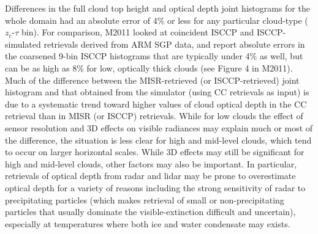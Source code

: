 Differences in the full cloud top height and optical depth joint
histograms for the whole domain had an absolute error of 4\% or less for
any particular cloud-type (\(z_c\)-\(\tau\) bin). For comparison, M2011
looked at coincident ISCCP and ISCCP-simulated retrievals derived from
ARM SGP data, and report absolute errors in the coarsened 9-bin ISCCP
histograms that are typically under 4\% as well, but can be as high as
8\% for low, optically thick clouds (see Figure 4 in M2011). Much of the
difference between the MISR-retrieved (or ISCCP-retrieved) joint
histogram and that obtained from the simulator (using CC retrievals as
input) is due to a systematic trend toward higher values of cloud
optical depth in the CC retrieval than in MISR (or ISCCP) retrievals.
While for low clouds the effect of sensor resolution and 3D effects on
visible radiances may explain much or most of the difference, the
situation is less clear for high and mid-level clouds, which tend to
occur on larger horizontal scales. While 3D effects may still be
significant for high and mid-level clouds, other factors may also be
important. In particular, retrievals of optical depth from radar and
lidar may be prone to overestimate optical depth for a variety of
reasons including the strong sensitivity of radar to precipitating
particles (which makes retrieval of small or non-precipitating particles
that usually dominate the visible-extinction difficult and uncertain),
especially at temperatures where both ice and water condensate may
exists.

